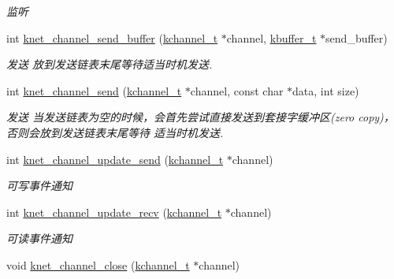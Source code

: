\begin{DoxyCompactItemize}
\begin{DoxyCompactList}\small\item\em 监听 \end{DoxyCompactList}\item 
int \hyperlink{a00051_aeef6af4f8e4d97905640ade15dc13c33_aeef6af4f8e4d97905640ade15dc13c33}{knet\+\_\+channel\+\_\+send\+\_\+buffer} (\hyperlink{a00056_aca9cd34897582aa9969245a93cc62fb5_aca9cd34897582aa9969245a93cc62fb5}{kchannel\+\_\+t} $\ast$channel, \hyperlink{a00056_a4b09a7574cd440f9b94285ab73c81b4e_a4b09a7574cd440f9b94285ab73c81b4e}{kbuffer\+\_\+t} $\ast$send\+\_\+buffer)
\begin{DoxyCompactList}\small\item\em 发送 放到发送链表末尾等待适当时机发送. \end{DoxyCompactList}\item 
int \hyperlink{a00051_ad7d429bb2a30ded75493a9ccf22bad63_ad7d429bb2a30ded75493a9ccf22bad63}{knet\+\_\+channel\+\_\+send} (\hyperlink{a00056_aca9cd34897582aa9969245a93cc62fb5_aca9cd34897582aa9969245a93cc62fb5}{kchannel\+\_\+t} $\ast$channel, const char $\ast$data, int size)
\begin{DoxyCompactList}\small\item\em 发送 当发送链表为空的时候，会首先尝试直接发送到套接字缓冲区(zero copy)，否则会放到发送链表末尾等待 适当时机发送. \end{DoxyCompactList}\item 
int \hyperlink{a00051_a6b94f1431ad03b1bc7497d5680f2c8fe_a6b94f1431ad03b1bc7497d5680f2c8fe}{knet\+\_\+channel\+\_\+update\+\_\+send} (\hyperlink{a00056_aca9cd34897582aa9969245a93cc62fb5_aca9cd34897582aa9969245a93cc62fb5}{kchannel\+\_\+t} $\ast$channel)
\begin{DoxyCompactList}\small\item\em 可写事件通知 \end{DoxyCompactList}\item 
int \hyperlink{a00051_a0e79d45ab68ec6cc5c85425231f3e9a1_a0e79d45ab68ec6cc5c85425231f3e9a1}{knet\+\_\+channel\+\_\+update\+\_\+recv} (\hyperlink{a00056_aca9cd34897582aa9969245a93cc62fb5_aca9cd34897582aa9969245a93cc62fb5}{kchannel\+\_\+t} $\ast$channel)
\begin{DoxyCompactList}\small\item\em 可读事件通知 \end{DoxyCompactList}\item 
void \hyperlink{a00051_ad9ce907288d44a762a93ff54c4a4a7af_ad9ce907288d44a762a93ff54c4a4a7af}{knet\+\_\+channel\+\_\+close} (\hyperlink{a00056_aca9cd34897582aa9969245a93cc62fb5_aca9cd34897582aa9969245a93cc62fb5}{kchannel\+\_\+t} $\ast$channel)

\end{DoxyCompactItemize}
